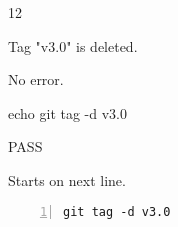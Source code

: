 \begin{description}[align=right,leftmargin=3.2cm,labelindent=3.0cm]
\item[Step:] 12
\item[Confirm:] Tag "v3.0" is deleted.
\item[Expectation:] No error.
\item[Command:] echo git  tag -d v3.0
\item[Test Result:] PASS
\item[Evidence:] Starts on next line.
\end{description}
\begin{lstlisting}[numbers=left]
git tag -d v3.0

\end{lstlisting}

